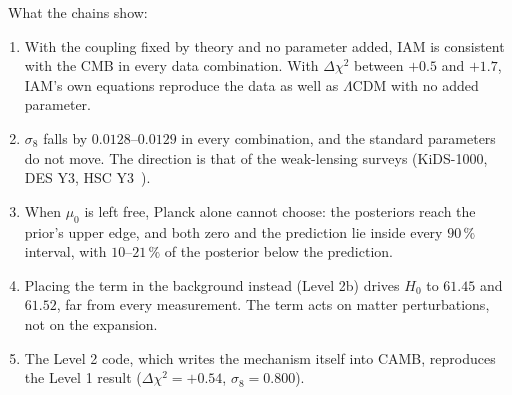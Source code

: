 \measured\ What the chains show:
\begin{enumerate}
 \item With the coupling fixed by theory and no parameter added, IAM is consistent with the CMB in every data combination.
       With $\Delta\chi^2$ between $+0.5$ and $+1.7$, IAM's own equations reproduce the data as well as $\Lambda$CDM with no added parameter.
 \item $\sigma_8$ falls by $0.0128$--$0.0129$ in every combination, and the standard parameters do not move.
       The direction is that of the weak-lensing surveys (KiDS-1000, DES Y3, HSC Y3~\cite{Asgari2021,DESY3,HSCY3}).
 \item When $\mu_0$ is left free, Planck alone cannot choose: the posteriors reach the prior's upper edge, and both zero and the prediction
       lie inside every $90\,\%$ interval, with $10$--$21\,\%$ of the posterior below the prediction.
 \item Placing the term in the background instead (Level 2b) drives $H_0$ to $61.45$ and $61.52$, far from every measurement.
       The term acts on matter perturbations, not on the expansion.
 \item The Level 2 code, which writes the mechanism itself into CAMB, reproduces the Level 1 result ($\Delta\chi^2=+0.54$, $\sigma_8=0.800$).
\end{enumerate}

